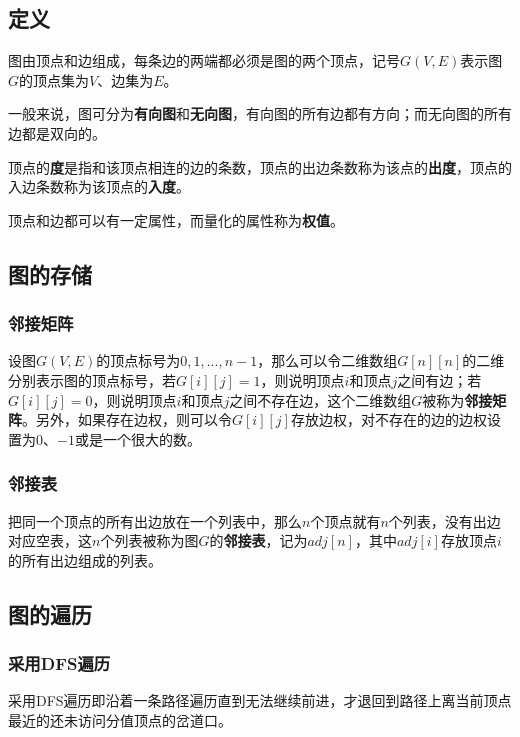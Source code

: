 \subsection{定义}

图由顶点和边组成，每条边的两端都必须是图的两个顶点，记号$G(V,E)$表示图$G$的顶点集为$V$、边集为$E$。

一般来说，图可分为\textbf{有向图}和\textbf{无向图}，有向图的所有边都有方向；而无向图的所有边都是双向的。

顶点的\textbf{度}是指和该顶点相连的边的条数，顶点的出边条数称为该点的\textbf{出度}，顶点的入边条数称为该顶点的\textbf{入度}。

顶点和边都可以有一定属性，而量化的属性称为\textbf{权值}。

\subsection{图的存储}

\subsubsection{邻接矩阵}

设图$G(V,E)$的顶点标号为$0,1,...,n-1$，那么可以令二维数组$G[n][n]$的二维分别表示图的顶点标号，若$G[i][j]=1$，则说明顶点$i$和顶点$j$之间有边；若$G[i][j]=0$，则说明顶点$i$和顶点$j$之间不存在边，这个二维数组$G$被称为\textbf{邻接矩阵}。另外，如果存在边权，则可以令$G[i][j]$存放边权，对不存在的边的边权设置为0、$-1$或是一个很大的数。

\subsubsection{邻接表}

把同一个顶点的所有出边放在一个列表中，那么$n$个顶点就有$n$个列表，没有出边对应空表，这$n$个列表被称为图$G$的\textbf{邻接表}，记为$adj[n]$，其中$adj[i]$存放顶点$i$的所有出边组成的列表。

\subsection{图的遍历}

\subsubsection{采用DFS遍历}

采用DFS遍历即沿着一条路径遍历直到无法继续前进，才退回到路径上离当前顶点最近的还未访问分值顶点的岔道口。


